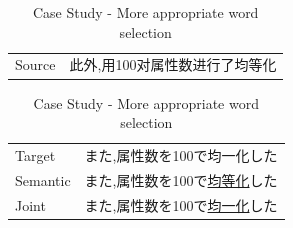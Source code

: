 \begin{table}[h]
    \begin{CJK}{UTF8}{gbsn}
        \begin{tabularx}{\textwidth}{p{1.2cm}b}
            Source & 此外,用100对属性数进行了均等化 \\
        \end{tabularx}
    \end{CJK}

    \begin{CJK}{UTF8}{ipxm}
        \begin{tabularx}{\textwidth}{p{1.2cm}b}
            Target & また,属性数を100で均一化した \\
            Semantic & また,属性数を100で\underline{均等化}した \\
            Joint & また,属性数を100で\underline{均一化}した \\\midrule
        \end{tabularx}
    \end{CJK}

    \caption{Case Study - More appropriate word selection}
    \label{tab:case_study4}
\end{table}

